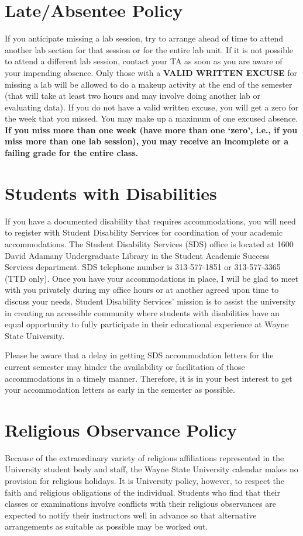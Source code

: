 \section*{Late/Absentee Policy}
If you anticipate missing a lab session, try to arrange ahead of time to attend another lab section for that session or for the entire lab unit.
If it is not possible to attend a different lab session, contact your TA as soon as you are aware of your impending absence.
Only those with a \textbf{VALID WRITTEN EXCUSE} for missing a lab will be allowed to do a makeup activity at the end of the semester (that will take at least two hours and may involve doing another lab or evaluating data).
If you do not have a valid written excuse, you will get a zero for the week that you missed.
You may make up a maximum of one excused absence.
\textbf{If you miss more than one week (have more than one `zero', i.e., if you miss more than one lab session), you may receive an incomplete or a failing grade for the entire class.}

\newpage

\section*{Students with Disabilities}
If you have a documented disability that requires accommodations, you will need to register with Student Disability Services for coordination of your academic accommodations. 
The Student Disability Services (SDS) office is located at 1600 David Adamany Undergraduate Library in the Student Academic Success Services department. 
SDS telephone number is 313-577-1851 or 313-577-3365 (TTD only). 
Once you have your accommodations in place, I will be glad to meet with you privately during my office hours or at another agreed upon time to discuss your needs. 
Student Disability Services' mission is to assist the university in creating an accessible community where students with disabilities have an equal opportunity to fully participate in their educational experience at Wayne State University.
\par
Please be aware that a delay in getting SDS accommodation letters for the current semester may hinder the availability or facilitation of those accommodations in a timely manner.
Therefore, it is in your best interest to get your accommodation letters as early in the semester as possible.

\section*{Religious Observance Policy}
Because of the extraordinary variety of religious affiliations represented in the University student body and staff, the Wayne State University calendar makes no provision for religious holidays.
It is University policy, however, to respect the faith and religious obligations of the individual.
Students who find that their classes or examinations involve conflicts with their religious observances are expected to notify their instructors well in advance so that alternative arrangements as suitable as possible may be worked out.